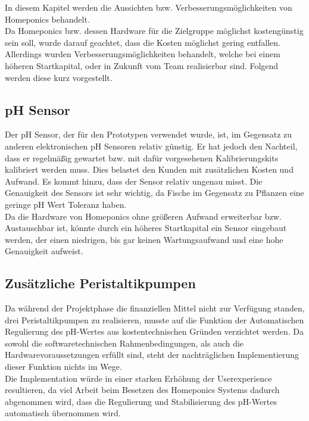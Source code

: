 \setcounter{page}{143}
In diesem Kapitel werden die Aussichten bzw. Verbesserungsmöglichkeiten von Homeponics behandelt.\\Da Homeponics bzw. dessen Hardware für die Zielgruppe möglichst kostengünstig sein soll, wurde darauf geachtet, dass die Kosten möglichst gering entfallen. Allerdings wurden Verbesserungsmöglichkeiten behandelt, welche bei einem höheren Startkapital, oder in Zukunft vom Team realisierbar sind.
Folgend werden diese kurz vorgestellt.

\subsection{pH Sensor}
Der pH Sensor, der für den Prototypen verwendet wurde, ist, im Gegensatz zu anderen elektronischen pH Sensoren relativ günstig. Er hat jedoch den Nachteil, dass er regelmäßig gewartet bzw. mit dafür vorgesehenen Kalibrierungskits kalibriert werden muss. Dies belastet den Kunden mit zusätzlichen Kosten und Aufwand. Es kommt hinzu, dass der Sensor relativ ungenau misst. Die Genauigkeit des Sensors ist sehr wichtig, da Fische im Gegensatz zu Pflanzen eine geringe pH Wert Toleranz haben.\\ Da die Hardware von Homeponics ohne größeren Aufwand erweiterbar bzw. Austauschbar ist, könnte durch ein höheres Startkapital ein Sensor eingebaut werden, der einen niedrigen, bis gar keinen Wartungsaufwand und eine hohe Genauigkeit aufweist.

\subsection{Zusätzliche Peristaltikpumpen}
Da während der Projektphase die finanziellen Mittel nicht zur Verfügung standen, drei Peristaltikpumpen zu realisieren, musste auf die Funktion der Automatischen Regulierung des pH-Wertes aus kostentechnischen Gründen verzichtet werden. Da sowohl die softwaretechnischen Rahmenbedingungen, als auch die Hardwarevoraussetzungen erfüllt sind, steht der nachträglichen Implementierung dieser Funktion nichts im Wege. \\
Die Implementation würde in einer starken Erhöhung der Userexperience resultieren, da viel Arbeit beim Besetzen des Homeponics Systems dadurch abgenommen wird, dass die Regulierung und Stabilisierung des pH-Wertes automatisch übernommen wird.  

\newpage
